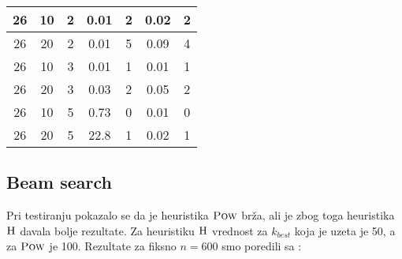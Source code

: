 \documentclass{article}
\begin{document}
\begin{center}
\begin{tabular}{| c c c | c c | c c |}
            \hline
            26         & 10  & 2   & 0.01   & 2          & 0.02   & 2          \\
            \hline
            26         & 20  & 2   & 0.01   & 5          & 0.09   & 4          \\
            \hline
            26         & 10  & 3   & 0.01   & 1          & 0.01   & 1          \\
            \hline
            26         & 20  & 3   & 0.03   & 2          & 0.05   & 2          \\
            \hline
            26         & 10  & 5   & 0.73   & 0          & 0.01   & 0          \\
            \hline
            26         & 20  & 5   & 22.8   & 1          & 0.02   & 1          \\
            \hline
        \end{tabular}
    \end{center}

    \pagebreak

    \subsection{Beam search}
    Pri testiranju pokazalo se da je heuristika $\textsc{Pow}$ brža, ali je zbog toga heuristika $\textsc{H}$ davala bolje rezultate. Za heuristiku $\textsc{H}$ vrednost za $k_{best}$ koja je uzeta je 50, a za $\textsc{Pow}$ je 100. Rezultate za fiksno $n=600$ smo poredili sa \cite{res}:
\end{document}
